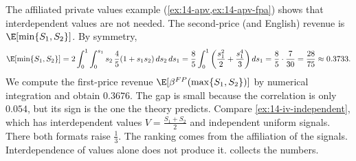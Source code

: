The affiliated private values example (\cref{ex:14-apv,ex:14-apv-fpa}) shows that interdependent values are
not needed. The second-price (and English) revenue is $\E[\min\{S_1,S_2\}]$. By symmetry,
\begin{equation*}
  \E[\min\{S_1,S_2\}]=2\int_0^1\int_0^{s_1}s_2\,\frac{4}{5}(1+s_1s_2)\,ds_2\,ds_1
  =\frac{8}{5}\int_0^1\left(\frac{s_1^2}{2}+\frac{s_1^4}{3}\right)ds_1=\frac{8}{5}\cdot\frac{7}{30}=\frac{28}{75}
  \approx0.3733.
\end{equation*}
We compute the first-price revenue $\E[\beta^{FP}(\max\{S_1,S_2\})]$ by numerical integration and obtain
$0.3676$. The gap is small because the correlation is only $0.054$, but its sign is the one the theory
predicts. Compare \cref{ex:14-iv-independent}, which has interdependent values $V=\frac{S_1+S_2}{2}$
and independent uniform signals. There both formats raise $\frac{1}{3}$. The ranking comes from the
affiliation of the signals. Interdependence of values alone does not produce it. 
collects the numbers.

